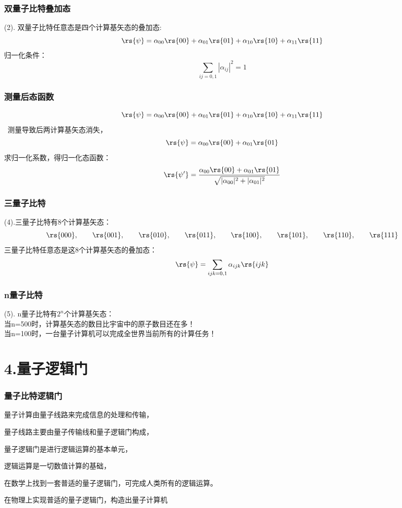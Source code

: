 \begin{frame} 
    \frametitle{双量子比特叠加态}
(2). 双量子比特任意态是四个计算基矢态的叠加态:
 \[\rs{\psi} =\alpha_{00}\rs{00}+\alpha_{01}\rs{01}+\alpha_{10}\rs{10}+\alpha_{11}\rs{11}\]
 归一化条件：
 \[ \sum_{ij=0,1} |\alpha_{ij}|^2= 1\]
\end{frame}

\begin{frame} 
    \frametitle{测量后态函数}
 \[\rs{\psi} =\alpha_{00}\rs{00}+\alpha_{01}\rs{01}+\alpha_{10}\rs{10}+\alpha_{11}\rs{11}\]
 \解~测量导致后两计算基矢态消失，
 \[\rs{\psi} =\alpha_{00}\rs{00}+\alpha_{01}\rs{01}\]
 求归一化系数，得归一化态函数：
 \[\rs{\psi'} =\frac{\alpha_{00}\rs{00}+\alpha_{01}\rs{01}}{\sqrt{|\alpha_{00}|^2+ |\alpha_{01}|^2}} \]
\end{frame}

\begin{frame} 
    \frametitle{三量子比特}
(4).三量子比特有8个计算基矢态：\\
\[\rs{000}, \qquad \rs{001}, \qquad \rs{010}, \qquad \rs{011} , \qquad \rs{100}, \qquad \rs{101}, \qquad \rs{110}, \qquad \rs{111} \] 
三量子比特任意态是这8个计算基矢态的叠加态：
\[\rs{\psi} =\sum_{ijk=0,1} \alpha_{ijk}\rs{ijk}\] 
\end{frame}

\begin{frame} 
    \frametitle{n量子比特}
(5). n量子比特有$2^n$个计算基矢态：\\
{\Bullet} 当n=500时，计算基矢态的数目比宇宙中的原子数目还在多！\\
{\Bullet} 当n=100时，一台量子计算机可以完成全世界当前所有的计算任务！
\end{frame}

\section{4.量子逻辑门}

\begin{frame} 
    \frametitle{量子比特逻辑门}

{\Bullet} 量子计算由量子线路来完成信息的处理和传输，

{\Bullet} 量子线路主要由量子传输线和量子逻辑门构成，

{\Bullet} 量子逻辑门是进行逻辑运算的基本单元，

{\Bullet} 逻辑运算是一切数值计算的基础，

{\Bullet} 在数学上找到一套普适的量子逻辑门，可完成人类所有的逻辑运算。

{\Bullet} 在物理上实现普适的量子逻辑门，构造出量子计算机

\end{frame}

